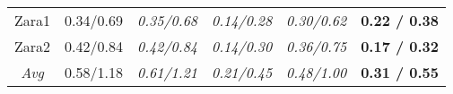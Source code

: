 \documentclass[a4paper,conference]{IEEEtran}
\newcommand{\tbf}[1]{{\textbf{#1}}}
\begin{document}
\begin{table}[t]
\begin{center}
{\begin{tabular}{cccccc}
Zara1              & 0.34/0.69       & \emph{0.35/0.68}       & \emph{0.14/0.28}& \emph{0.30/0.62}  & \tbf{0.22 / 0.38}                     \\
Zara2                & 0.42/0.84       & \emph{0.42/0.84}       & \emph{0.14/0.30}  & \emph{0.36/0.75}& \tbf{0.17 / 0.32}                     \\
\midrule
\emph{Avg}                  & 0.58/1.18       & \emph{0.61/1.21}   & \emph{0.21/0.45}   & \emph{0.48/1.00}   & \tbf{0.31 / 0.55}     \\               
\bottomrule
\end{tabular}
}
\end{center}
\vspace{-0.7cm}

\end{table}
\end{document}

